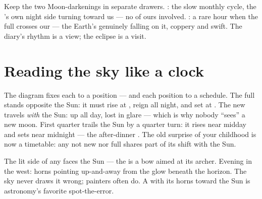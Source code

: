\begin{example}\label{ex:g7:moon-phases:eclipsevs}
Keep the two Moon-darkenings in separate drawers. \emph{}:
the slow monthly cycle, the 's own night side turning toward
us --- no  of ours involved. \emph{}: a rare
hour when the full  crosses our  --- the Earth's 
genuinely falling on it, coppery and swift. The diary's rhythm is
a view; the eclipse is a visit.
\end{example}

\section{Reading the sky like a clock}

\begin{example}\label{ex:g7:moon-phases:hours}
The diagram fixes each  to a position --- and each position
to a schedule. The full  stands opposite the Sun: it must
rise at , reign all night, and set at . The new
 travels \emph{with} the Sun: up all day, lost in glare ---
which is why nobody ``sees'' a new moon. First quarter trails
the Sun by a quarter turn: it rises near midday and sets near
midnight --- the after-dinner . The old  surprise
of your childhood is now a timetable: any  not new nor full
shares part of its shift with the Sun.
\end{example}

\begin{example}\label{ex:g7:moon-phases:points}
The lit side of any  faces the Sun --- the  is a
bow aimed at its archer. Evening  in the west: horns
pointing up-and-away from the  glow beneath the horizon.
The sky never draws it wrong; painters often do. A  with
its horns toward the Sun is astronomy's favorite spot-the-error.
\end{example}

